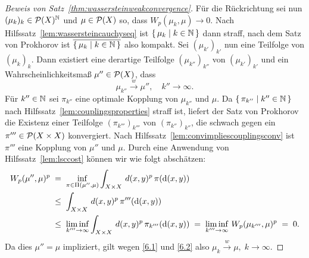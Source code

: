 \documentclass[../main/main.tex]{subfiles}
\begin{document}
\begin{proof}[Beweis von Satz~\ref{thm:wassersteinweakconvergence}]
		Für die Rückrichtung sei nun $(\mu_k)_k \in \mathcal{P}(X)^{\mathbb{N}}$ und $\mu \in \mathcal{P}(X)$ so, dass $W_p(\mu_k, \mu) \to 0$. Nach Hilfssatz~\ref{lem:wassersteincauchyseq} ist $\left\{\, \mu_k \; \middle| \; k \in \mathbb{N} \,\right\}$ dann straff, nach dem Satz von Prokhorov ist $\overline{\left\{\, \mu_k \; \middle| \; k \in \mathbb{N} \,\right\}}$ also kompakt. Sei $(\mu_{k'})_{k'}$ nun eine Teilfolge von $(\mu_k)_k$. Dann existiert eine derartige Teilfolge $(\mu_{k''})_{k''}$ von $(\mu_{k'})_{k'}$ und ein Wahrscheinlichkeitsmaß $\mu'' \in \mathcal{P}(X)$, dass
		\[ \mu_{k''} \xrightarrow{w} \mu'', \quad k'' \to \infty \text{.} \label{6.2} \tag{6.2} \]
		Für $k'' \in \mathbb{N}$ sei $\pi_{k''}$ eine optimale Kopplung von $\mu_{k''}$ und $\mu$. Da $\left\{\, \pi_{k''} \; \middle| \; k'' \in \mathbb{N} \,\right\}$ nach Hilfssatz~\ref{lem:couplingsproperties} straff ist, liefert der Satz von Prokhorov die Existenz einer Teilfolge $(\pi_{k'''})_{k'''}$ von $(\pi_{k''})_{k''}$, die schwach gegen ein $\pi''' \in \mathcal{P}(X \times X)$ konvergiert. Nach Hilfssatz~\ref{lem:convimpliescouplingsconv} ist $\pi'''$ eine Kopplung von $\mu''$ und $\mu$. Durch eine Anwendung von Hilfssatz~\ref{lem:lsccost} können wir wie folgt abschätzen:
		\begin{align*}
			W_p(\mu'', \mu)^p \; &= \; \inf_{\pi \in \Pi(\mu'', \mu)} \int_{X \times X} \, d(x, y)^p \, \pi(\mathrm{d}(x, y)) \\
			                \; &\leq \; \int_{X \times X} \, d(x, y)^p \, \pi'''(\mathrm{d}(x, y)) \\
			                \; &\leq \; \liminf_{k''' \to \infty} \int_{X \times X} \, d(x, y)^p \, \pi_{k'''}(\mathrm{d}(x, y)) \; = \; \liminf_{k''' \to \infty} \, W_p( \mu_{k'''}, \mu)^p \; = \; 0 \text{.}
		\end{align*}
		Da dies $\mu'' = \mu$ impliziert, gilt wegen \eqref{6.1} und \eqref{6.2} also
		$\mu_k \xrightarrow{w} \mu, \; k \to \infty$.
	\end{proof}
	
\end{document}
